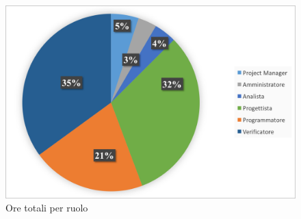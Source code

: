 \begin{figure}[H]
	\centering 
	\includegraphics[scale=0.7]{Immagini/GraficiTorte/TOT.png}
	\caption{Ore totali per ruolo}
\end{figure}